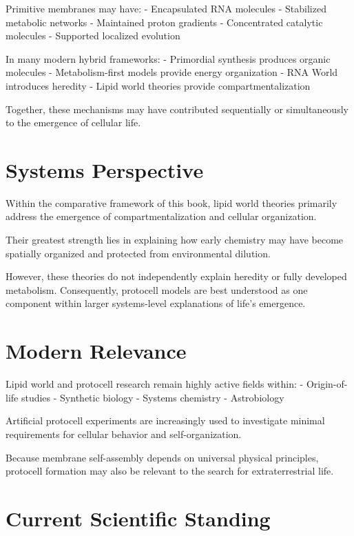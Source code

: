 \documentclass[
  oneside]{book}
\begin{document}
Primitive membranes may have:
- Encapsulated RNA molecules
- Stabilized metabolic networks
- Maintained proton gradients
- Concentrated catalytic molecules
- Supported localized evolution

In many modern hybrid frameworks:
- Primordial synthesis produces organic molecules
- Metabolism-first models provide energy organization
- RNA World introduces heredity
- Lipid world theories provide compartmentalization

Together, these mechanisms may have contributed sequentially or simultaneously to the emergence of cellular life.

\section{Systems Perspective}\label{systems-perspective-3}

Within the comparative framework of this book, lipid world theories primarily address the emergence of compartmentalization and cellular organization.

Their greatest strength lies in explaining how early chemistry may have become spatially organized and protected from environmental dilution.

However, these theories do not independently explain heredity or fully developed metabolism. Consequently, protocell models are best understood as one component within larger systems-level explanations of life's emergence.

\section{Modern Relevance}\label{modern-relevance-3}

Lipid world and protocell research remain highly active fields within:
- Origin-of-life studies
- Synthetic biology
- Systems chemistry
- Astrobiology

Artificial protocell experiments are increasingly used to investigate minimal requirements for cellular behavior and self-organization.

Because membrane self-assembly depends on universal physical principles, protocell formation may also be relevant to the search for extraterrestrial life.

\section{Current Scientific Standing}\label{current-scientific-standing-3}
\end{document}
